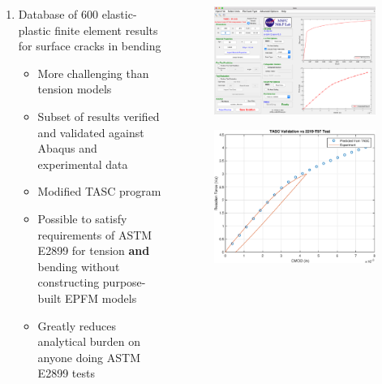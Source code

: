 \begin{frame}
\begin{columns}
\begin{column}{0.6\textwidth}
\begin{enumerate}
\item Database of 600 elastic-plastic finite element results for surface cracks in bending
\begin{itemize}
\item More challenging than tension models
\item Subset of results verified and validated against Abaqus and experimental data
\item Modified TASC program
\item Possible to satisfy requirements of ASTM E2899 for tension {\bfseries and} bending without constructing purpose-built EPFM models
\item Greatly reduces analytical burden on anyone doing ASTM E2899 tests
\end{itemize}
\end{enumerate}
\end{column}
\begin{column}{0.3\textwidth}
\begin{figure}[tbp]
\centering
\includegraphics[width=0.8\columnwidth]{tasc-force-cmod-validation}
\end{figure}
\begin{figure}[tbp]
\centering
\includegraphics[width=0.75\columnwidth]{experimental-validation}

\end{figure}
\end{column}
\end{columns}
\end{frame}
